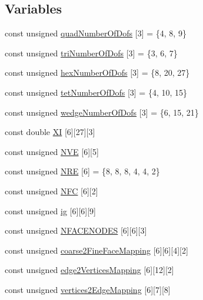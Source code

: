 \subsection*{Variables}
\begin{DoxyCompactItemize}
\item 
const unsigned \mbox{\hyperlink{namespacefemus_aa96ee7b7b7a40356557c4901525affb1}{quad\+Number\+Of\+Dofs}} \mbox{[}3\mbox{]} = \{4, 8, 9\}
\item 
const unsigned \mbox{\hyperlink{namespacefemus_a52acce8e5ee8a9ac805ec5be5e265bcf}{tri\+Number\+Of\+Dofs}} \mbox{[}3\mbox{]} = \{3, 6, 7\}
\item 
const unsigned \mbox{\hyperlink{namespacefemus_a5764d8d5cef480482021b6e071cc088d}{hex\+Number\+Of\+Dofs}} \mbox{[}3\mbox{]} = \{8, 20, 27\}
\item 
const unsigned \mbox{\hyperlink{namespacefemus_a6c7ed3acdc679619e3facecfbc86e342}{tet\+Number\+Of\+Dofs}} \mbox{[}3\mbox{]} = \{4, 10, 15\}
\item 
const unsigned \mbox{\hyperlink{namespacefemus_a9b495c343e2d245727e13cd51f455566}{wedge\+Number\+Of\+Dofs}} \mbox{[}3\mbox{]} = \{6, 15, 21\}
\item 
const double \mbox{\hyperlink{namespacefemus_a36856ad1d79c55d94b1f9af895dc7f11}{XI}} \mbox{[}6\mbox{]}\mbox{[}27\mbox{]}\mbox{[}3\mbox{]}
\item 
const unsigned \mbox{\hyperlink{namespacefemus_a3d53e4927b8f0f363df71826cc9d8b9c}{N\+VE}} \mbox{[}6\mbox{]}\mbox{[}5\mbox{]}
\item 
const unsigned \mbox{\hyperlink{namespacefemus_a04f7c8d5db5b1c3150b108f3dcb5f022}{N\+RE}} \mbox{[}6\mbox{]} = \{8, 8, 8, 4, 4, 2\}
\item 
const unsigned \mbox{\hyperlink{namespacefemus_a6c2ecc75dab06265197007d969b9f100}{N\+FC}} \mbox{[}6\mbox{]}\mbox{[}2\mbox{]}
\item 
const unsigned \mbox{\hyperlink{namespacefemus_a6df31099f676311de214a312d7043941}{ig}} \mbox{[}6\mbox{]}\mbox{[}6\mbox{]}\mbox{[}9\mbox{]}
\item 
const unsigned \mbox{\hyperlink{namespacefemus_aa64bce2ca72ce98136cf440d9ab68df8}{N\+F\+A\+C\+E\+N\+O\+D\+ES}} \mbox{[}6\mbox{]}\mbox{[}6\mbox{]}\mbox{[}3\mbox{]}
\item 
const unsigned \mbox{\hyperlink{namespacefemus_ace7b465b5a7044008102c88b1e0f9fec}{coarse2\+Fine\+Face\+Mapping}} \mbox{[}6\mbox{]}\mbox{[}6\mbox{]}\mbox{[}4\mbox{]}\mbox{[}2\mbox{]}
\item 
const unsigned \mbox{\hyperlink{namespacefemus_ac4d5ff6eca33042e8b267a58ea3752bc}{edge2\+Vertices\+Mapping}} \mbox{[}6\mbox{]}\mbox{[}12\mbox{]}\mbox{[}2\mbox{]}
\item 
const unsigned \mbox{\hyperlink{namespacefemus_a33bb4b81169a5ffccb477b577b610667}{vertices2\+Edge\+Mapping}} \mbox{[}6\mbox{]}\mbox{[}7\mbox{]}\mbox{[}8\mbox{]}
\end{DoxyCompactItemize}


